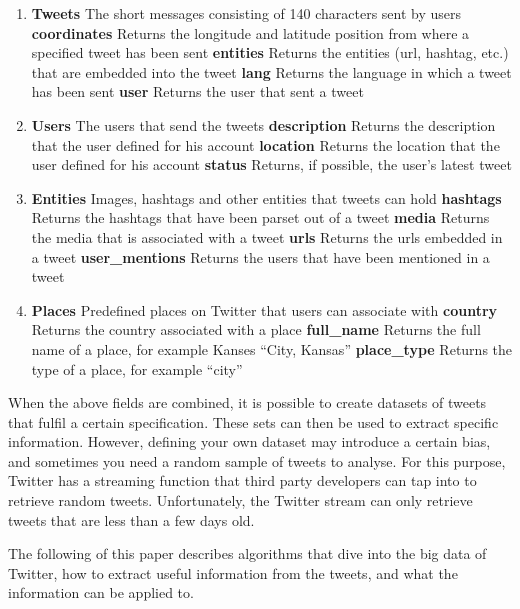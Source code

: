 \documentclass{article}
\begin{document}
\begin{enumerate}
\item \textbf{Tweets} The short messages consisting of 140 characters sent by users
	\subitem \textbf{coordinates} Returns the longitude and latitude position from where a specified tweet has been sent
	\subitem \textbf{entities} Returns the entities (url, hashtag, etc.) that are embedded into the tweet
	\subitem \textbf{lang} Returns the language in which a tweet has been sent
	\subitem \textbf{user} Returns the user that sent a tweet
\item \textbf{Users} The users that send the tweets
	\subitem \textbf{description} Returns the description that the user defined for his account
	\subitem \textbf{location} Returns the location that the user defined for his account
	\subitem \textbf{status} Returns, if possible, the user's latest tweet
\item \textbf{Entities} Images, hashtags and other entities that tweets can hold
	\subitem \textbf{hashtags} Returns the hashtags that have been parset out of a tweet
	\subitem \textbf{media} Returns the media that is associated with a tweet
	\subitem \textbf{urls} Returns the urls embedded in a tweet
	\subitem \textbf{user\_mentions} Returns the users that have been mentioned in a tweet
\item \textbf{Places} Predefined places on Twitter that users can associate with
	\subitem \textbf{country} Returns the country associated with a place
	\subitem \textbf{full\_name} Returns the full name of a place, for example Kanses ``City, Kansas''
	\subitem \textbf{place\_type} Returns the type of a place, for example ``city''
\end{enumerate}

When the above fields are combined, it is possible to create datasets of tweets that fulfil a certain specification. These sets can then be used to extract specific information. However, defining your own dataset may introduce a certain bias, and sometimes you need a random sample of tweets to analyse. For this purpose, Twitter has a streaming function that third party developers can tap into to retrieve random tweets. Unfortunately, the Twitter stream can only retrieve tweets that are less than a few days old.

The following of this paper describes algorithms that dive into the big data of Twitter, how to extract useful information from the tweets, and what the information can be applied to.

\end{document}
